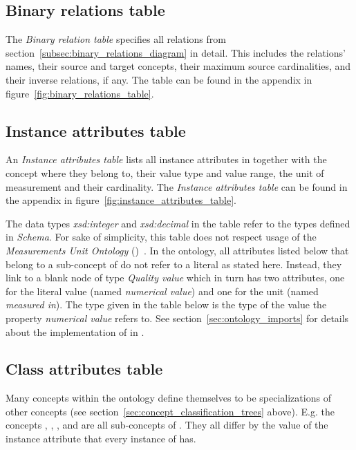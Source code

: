 \subsection{Binary relations table}
\label{subsec:binary_relations_table}

The \emph{Binary relation table} specifies all relations from section~\ref{subsec:binary_relations_diagram} in detail. This includes the relations' names, their source and target concepts, their maximum source cardinalities, and their inverse relations, if any. The table can be found in the appendix in figure~\ref{fig:binary_relations_table}.

\subsection{Instance attributes table}
\label{subsec:instance_attributes_table}

An \emph{Instance attributes table} lists all instance attributes in \smarthomeweather together with the concept where they belong to, their value type and value range, the unit of measurement and their cardinality. The \emph{Instance attributes table} can be found in the appendix in figure~\ref{fig:instance_attributes_table}.

The data types \emph{xsd:integer} and \emph{xsd:decimal} in the table refer to the types defined in \emph{ Schema}\cite{xml-schema-datatypes}. For sake of simplicity, this table does not respect usage of the \emph{Measurements Unit Ontology} (\muo)~\cite{MUO}. In the ontology, all attributes listed below that belong to a sub-concept of  do not refer to a literal as stated here. Instead, they link to a blank node of type \emph{Quality value} which in turn has two attributes, one for the literal value (named \emph{numerical value}) and one for the unit (named \emph{measured in}). The type given in the table below is the type of the value the property \emph{numerical value} refers to. See section~\ref{sec:ontology_imports} for details about the implementation of \muo in \smarthomeweather.

\subsection{Class attributes table}
\label{subsec:class_attributes_table}

Many concepts within the \smarthomeweather ontology define themselves to be specializations of other concepts (see section~\ref{sec:concept_classification_trees} above). E.g. the concepts , , ,  and  are all sub-concepts of . They all differ by the value of the instance attribute  that every instance of  has.

